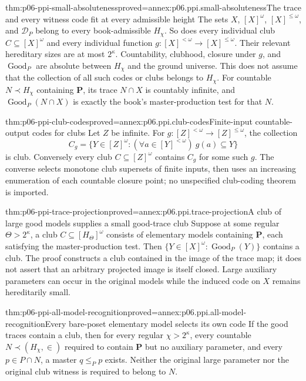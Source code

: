 \begin{hblemma}{thm:p06-ppi-small-absoluteness}{proved=annex:p06.ppi.small-absoluteness}{The trace and every witness code fit at every admissible height}
The sets \(X\), \([X]^\omega\), \([X]^{\leq\omega}\), and
\(\mathcal D_P\) belong to every book-admissible \(H_\chi\).
So does every individual club \(C\subseteq[X]^\omega\) and every
individual function \(g:[X]^{<\omega}\to[X]^{\leq\omega}\).
Their relevant hereditary sizes are at most \(2^\kappa\).
Countability, clubhood, closure under \(g\), and \(\operatorname{Good}_P\)
are absolute between \(H_\chi\) and the ground universe. This does not
assume that the collection of all such codes or clubs belongs to \(H_\chi\).
For countable \(N\prec H_\chi\) containing \(\mathbf P\), its trace
\(N\cap X\) is countably infinite, and \(\operatorname{Good}_P(N\cap X)\)
is exactly the book's master-production test for that \(N\).
\end{hblemma}

\begin{hblemma}{thm:p06-ppi-club-codes}{proved=annex:p06.ppi.club-codes}{Finite-input countable-output codes for clubs}
Let \(Z\) be infinite. For
\(g:[Z]^{<\omega}\to[Z]^{\leq\omega}\), the collection
\[
 C_g=\{Y\in[Z]^\omega:(\forall a\in[Y]^{<\omega})\ g(a)\subseteq Y\}
\]
is club. Conversely every club \(C\subseteq[Z]^\omega\) contains
\(C_g\) for some such \(g\). The converse selects monotone club
supersets of finite inputs, then uses an increasing enumeration of each
countable closure point; no unspecified club-coding theorem is imported.
\end{hblemma}

\begin{hblemma}{thm:p06-ppi-trace-projection}{proved=annex:p06.ppi.trace-projection}{A club of large good models supplies a small good-trace club}
Suppose at some regular \(\Theta>2^\kappa\), a club
\(C\subseteq[H_\Theta]^\omega\) consists of elementary models
containing \(\mathbf P\), each satisfying the master-production test.
Then \(\{Y\in[X]^\omega:\operatorname{Good}_P(Y)\}\) contains a club.
The proof constructs a club contained in the image of the trace map;
it does not assert that an arbitrary projected image is itself closed.
Large auxiliary parameters can occur in the original models while the
induced code on \(X\) remains hereditarily small.
\end{hblemma}

\begin{hblemma}{thm:p06-ppi-all-model-recognition}{proved=annex:p06.ppi.all-model-recognition}{Every bare-poset elementary model selects its own code}
If the good traces contain a club, then for every regular
\(\chi>2^\kappa\), every countable \(N\prec(H_\chi,\in)\) required
to contain \(\mathbf P\) but no auxiliary parameter, and every
\(p\in P\cap N\), a master
\(q\leq_P p\) exists. Neither the original large parameter nor the
original club witness is required to belong to \(N\).
\end{hblemma}

